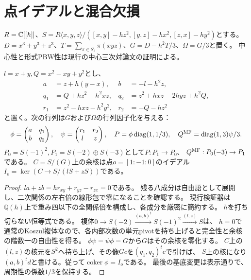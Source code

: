 \section{点イデアルと混合欠損}
$R=\mathbb C[[h]]$、$S=R\langle x,y,z\rangle/([x,y]-hz^2,[y,z]-hx^2,[z,x]-hy^2)$とする。
$D=x^3+y^3+z^3$、$T=\sum_{\pi\in S_3}\pi(xyz)$、$G=D-h^2T/3$、$\Omega=G/3$と置く。
中心性と形式PBW性は現行の中心三次対論文\cite{Pair}の証明による。
\begin{proposition}\label{mix:point}
$l=x+y,Q=x^2-xy+y^2$とし、
\begin{align*}
 a&=z+h(y-x),&b&=-l-h^2z,\\
 q_1&=Q+hz^2-h^2xz,&q_2&=z^2+hxz-2hyz+h^2Q,\\
 r_1&=z^2-hxz-h^2y^2,&r_2&=-Q-hz^2
\end{align*}
と置く。次の行列は$G$および$\Omega$の行列因子化を与える：
\[
 \phi=\begin{pmatrix}a&q_1\\b&q_2\end{pmatrix},\quad
 \psi=\begin{pmatrix}r_1&r_2\\l&z\end{pmatrix},\quad
 P=\phi\operatorname{diag}(1,1/3),\quad
 Q^{\rm MF}=\operatorname{diag}(1,3)\psi/3.
\]
$P_0=S(-1)^2,P_1=S(-2)\oplus S(-3)$として$P:P_1\to P_0$、
$Q^{\rm MF}:P_0(-3)\to P_1$である。
$C=S/(G)$上の余核は点$o=[1:-1:0]$のイデアル
$I_o=\ker(C\to S/(lS+zS))$である。
\end{proposition}
\begin{proof}
$la+zb=hr_{xy}+r_{yz}-r_{zx}=0$である。
残る八成分は自由語として展開し、二次関係の左右倍の線形包で零になることを確認する。
現行検証器は$\mathbb Q(h)$上で重み四以下の全関係倍を構成し、各成分を厳密に簡約する。
$h$を打ち切らない恒等式である。
複体$0\to S(-2)\xrightarrow{(a,b)^t}S(-1)^2\xrightarrow{(l,z)}S$は、
$h=0$で通常のKoszul複体なので、各内部次数の単元pivotを持ち上げると完全性と余核の階数一の自由性を得る。
$\phi\psi=\psi\phi=G$から$G$はその余核を零化する。
$C$上の$(l,z)$の核元を$S^2$へ持ち上げ、その像$Gc$を$(q_1,q_2)^tc$で引けば、
$S$上の核になり$(a,b)^td$と書ける。従って$\operatorname{coker}\phi=I_o$である。
最後の基底変更は表示通りで、周期性の係数$1/3$を保持する。
\end{proof}

